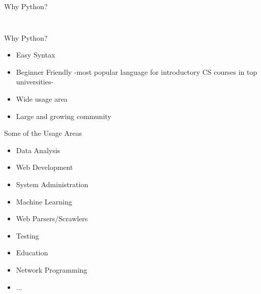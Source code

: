 	\begin{frame}{Why Python?}
		\vspace{-3mm}
		\inputminted[frame=single,framesep=2pt]{python3}{code-examples/io.py}
		\pause
		\inputminted[frame=single,framesep=2pt]{java}{code-examples/io.java}
	\end{frame}

	\begin{frame}{Why Python?}
		\begin{itemize}
			\LARGE
			\item Easy Syntax
			\item Beginner Friendly
			-most popular language for introductory CS courses in top universities\cite{guo1}- 
			\item Wide usage area
			\item Large and growing community
		\end{itemize}
	\end{frame}

	\begin{frame}{Some of the Usage Areas\cite{survey_jetbrains2018}}
		\begin{itemize}
			\LARGE
			\item Data Analysis
			\pause
			\item Web Development
			\pause
			\item System Administration
			\pause
			\item Machine Learning
			\pause
			\item Web Parsers/Scrawlers
			\pause
			\item Testing
			\pause
			\item Education
			\pause
			\item Network Programming
			\pause
			\item ...
		\end{itemize}	
	\end{frame}
	
